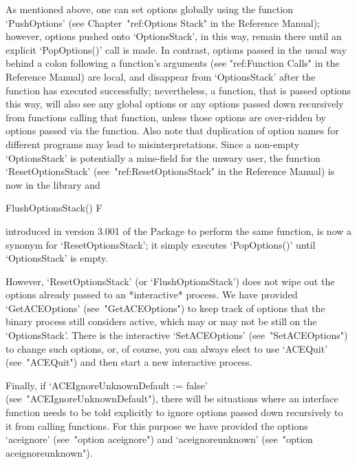 As mentioned above, one can set options globally  using  the  function
`PushOptions' (see Chapter~"ref:Options Stack" in the {\GAP} Reference
Manual); however, options pushed onto  `OptionsStack',  in  this  way,
remain there  until  an  explicit  `PopOptions()'  call  is  made.  In
contrast, options passed in the usual way behind a colon  following  a
function's arguments (see "ref:Function Calls" in the {\GAP} Reference
Manual)  are  local,  and  disappear  from  `OptionsStack'  after  the
function has executed successfully; nevertheless, a function, that  is
passed options this way, will also  see  any  global  options  or  any
options passed down recursively from functions calling that  function,
unless those  options  are  over-ridden  by  options  passed  via  the
function. Also note that duplication of  option  names  for  different
programs  may  lead   to   misinterpretations.   Since   a   non-empty
`OptionsStack' is potentially a mine-field for the  unwary  user,  the
function  `ResetOptionsStack'  (see~"ref:ResetOptionsStack"   in   the
Reference Manual) is now in the {\GAP} library and

\>FlushOptionsStack() F

introduced in version 3.001 of the {\ACE} Package to perform the  same
function, is now a synonym for `ResetOptionsStack'; it simply executes
`PopOptions()' until `OptionsStack' is empty.

However, `ResetOptionsStack' (or `FlushOptionsStack')  does  not  wipe
out the options already passed to an *interactive* {\ACE} process.  We
have provided `GetACEOptions' (see~"GetACEOptions") to keep  track  of
options that the {\ACE} binary process still considers  active,  which
may  or  may  not  be  still  on  the  `OptionsStack'.  There  is  the
interactive  `SetACEOptions'  (see~"SetACEOptions")  to  change   such
options, or,  of  course,  you  can  always  elect  to  use  `ACEQuit'
(see~"ACEQuit") and then start a new interactive {\ACE} process.

Finally,       if       `ACEIgnoreUnknownDefault       :=       false'
(see~"ACEIgnoreUnknownDefault"), there will  be  situations  where  an
{\ACE} interface function  needs  to  be  told  explicitly  to  ignore
options passed down recursively to it from calling functions. For this
purpose  we  have  provided  the  options   `aceignore'   (see~"option
aceignore") and `aceignoreunknown' (see~"option aceignoreunknown").


